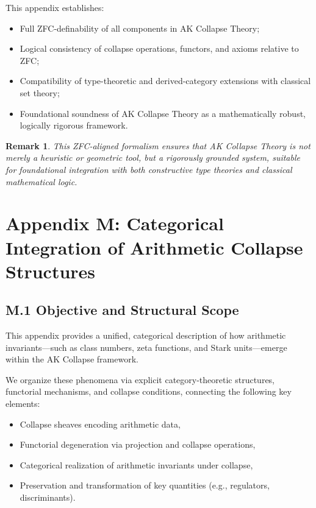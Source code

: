 \documentclass[11pt]{article}
\newtheorem{remark}[theorem]{Remark}
\begin{document}
This appendix establishes:

\begin{itemize}
    \item Full ZFC-definability of all components in AK Collapse Theory;
    \item Logical consistency of collapse operations, functors, and axioms relative to ZFC;
    \item Compatibility of type-theoretic and derived-category extensions with classical set theory;
    \item Foundational soundness of AK Collapse Theory as a mathematically robust, logically rigorous framework.
\end{itemize}

\begin{remark}
This ZFC-aligned formalism ensures that AK Collapse Theory is not merely a heuristic or geometric tool, but a rigorously grounded system, suitable for foundational integration with both constructive type theories and classical mathematical logic.
\end{remark}




\section*{Appendix M: Categorical Integration of Arithmetic Collapse Structures}

\subsection*{M.1 Objective and Structural Scope}

This appendix provides a unified, categorical description of how arithmetic invariants—such as class numbers, zeta functions, and Stark units—emerge within the AK Collapse framework.  

We organize these phenomena via explicit category-theoretic structures, functorial mechanisms, and collapse conditions, connecting the following key elements:
\begin{itemize}
  \item Collapse sheaves encoding arithmetic data,
  \item Functorial degeneration via projection and collapse operations,
  \item Categorical realization of arithmetic invariants under collapse,
  \item Preservation and transformation of key quantities (e.g., regulators, discriminants).
\end{itemize}
\end{document}
